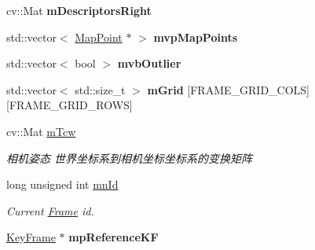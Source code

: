 \begin{DoxyCompactItemize}
\item 
\hypertarget{classORB__SLAM2_1_1Frame_afe3cee153dda7e06d5004fd959fcd88e}{cv\-::\-Mat {\bfseries m\-Descriptors\-Right}}\label{classORB__SLAM2_1_1Frame_afe3cee153dda7e06d5004fd959fcd88e}

\item 
\hypertarget{classORB__SLAM2_1_1Frame_a48e791ae28b483211dad6b3474027935}{std\-::vector$<$ \hyperlink{classORB__SLAM2_1_1MapPoint}{Map\-Point} $\ast$ $>$ {\bfseries mvp\-Map\-Points}}\label{classORB__SLAM2_1_1Frame_a48e791ae28b483211dad6b3474027935}

\item 
\hypertarget{classORB__SLAM2_1_1Frame_aa05cc57f36b5b04a2e1690e576c93fc8}{std\-::vector$<$ bool $>$ {\bfseries mvb\-Outlier}}\label{classORB__SLAM2_1_1Frame_aa05cc57f36b5b04a2e1690e576c93fc8}

\item 
\hypertarget{classORB__SLAM2_1_1Frame_a194dca06186458639d46234d828afeed}{std\-::vector$<$ std\-::size\-\_\-t $>$ {\bfseries m\-Grid} \mbox{[}F\-R\-A\-M\-E\-\_\-\-G\-R\-I\-D\-\_\-\-C\-O\-L\-S\mbox{]}\mbox{[}F\-R\-A\-M\-E\-\_\-\-G\-R\-I\-D\-\_\-\-R\-O\-W\-S\mbox{]}}\label{classORB__SLAM2_1_1Frame_a194dca06186458639d46234d828afeed}

\item 
\hypertarget{classORB__SLAM2_1_1Frame_a3be6708cfd359fae30307f9408abd6f9}{cv\-::\-Mat \hyperlink{classORB__SLAM2_1_1Frame_a3be6708cfd359fae30307f9408abd6f9}{m\-Tcw}}\label{classORB__SLAM2_1_1Frame_a3be6708cfd359fae30307f9408abd6f9}

\begin{DoxyCompactList}\small\item\em 相机姿态 世界坐标系到相机坐标坐标系的变换矩阵 \end{DoxyCompactList}\item 
\hypertarget{classORB__SLAM2_1_1Frame_acd59686475a89bfdfcae316dfa6b6069}{long unsigned int \hyperlink{classORB__SLAM2_1_1Frame_acd59686475a89bfdfcae316dfa6b6069}{mn\-Id}}\label{classORB__SLAM2_1_1Frame_acd59686475a89bfdfcae316dfa6b6069}

\begin{DoxyCompactList}\small\item\em Current \hyperlink{classORB__SLAM2_1_1Frame}{Frame} id. \end{DoxyCompactList}\item 
\hypertarget{classORB__SLAM2_1_1Frame_a4f5187c3a75ef493687fa0582fed0aa8}{\hyperlink{classORB__SLAM2_1_1KeyFrame}{Key\-Frame} $\ast$ {\bfseries mp\-Reference\-K\-F}}\label{classORB__SLAM2_1_1Frame_a4f5187c3a75ef493687fa0582fed0aa8}


\end{DoxyCompactItemize}
